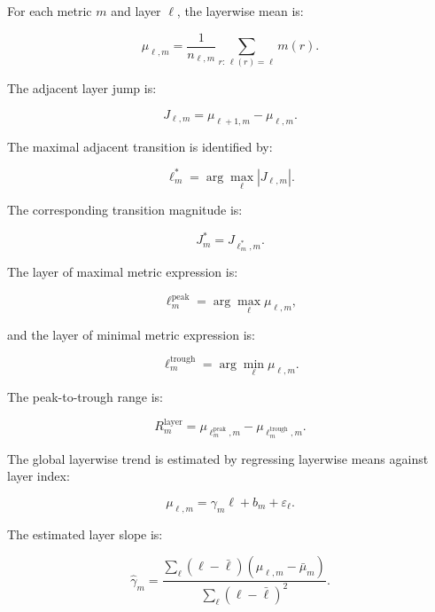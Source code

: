 For each metric $m$ and layer $\ell$, the layerwise mean is:

\begin{equation}
\mu_{\ell,m}
=
\frac{1}{n_{\ell,m}}
\sum_{r:\,\ell(r)=\ell}
m(r).
\end{equation}

The adjacent layer jump is:

\begin{equation}
J_{\ell,m}
=
\mu_{\ell+1,m}
-
\mu_{\ell,m}.
\end{equation}

The maximal adjacent transition is identified by:

\begin{equation}
\ell_m^{*}
=
\arg\max_{\ell}
\left|
J_{\ell,m}
\right|.
\end{equation}

The corresponding transition magnitude is:

\begin{equation}
J_m^{*}
=
J_{\ell_m^{*},m}.
\end{equation}

The layer of maximal metric expression is:

\begin{equation}
\ell^{\mathrm{peak}}_m
=
\arg\max_{\ell}
\mu_{\ell,m},
\end{equation}

and the layer of minimal metric expression is:

\begin{equation}
\ell^{\mathrm{trough}}_m
=
\arg\min_{\ell}
\mu_{\ell,m}.
\end{equation}

The peak-to-trough range is:

\begin{equation}
R_m^{\mathrm{layer}}
=
\mu_{\ell^{\mathrm{peak}}_m,m}
-
\mu_{\ell^{\mathrm{trough}}_m,m}.
\end{equation}

The global layerwise trend is estimated by regressing layerwise means against layer index:

\begin{equation}
\mu_{\ell,m}
=
\gamma_m \ell
+
b_m
+
\varepsilon_{\ell}.
\end{equation}

The estimated layer slope is:

\begin{equation}
\hat{\gamma}_m
=
\frac{
\sum_{\ell}
\left(
\ell-\bar{\ell}
\right)
\left(
\mu_{\ell,m}-\bar{\mu}_{m}
\right)
}{
\sum_{\ell}
\left(
\ell-\bar{\ell}
\right)^2
}.
\end{equation}

